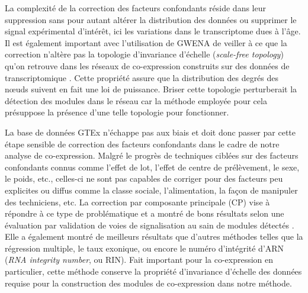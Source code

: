 La complexité de la correction des facteurs confondants réside dans leur suppression sans pour autant altérer la distribution des données ou supprimer le signal expérimental d'intérêt, ici les variations dans le transcriptome dues à l'âge. 
Il est également important avec l'utilisation de GWENA de veiller à ce que la correction n'altère pas la topologie d'invariance d'échelle (\textit{scale-free topology}) qu'on retrouve dans les réseaux de co-expression construits sur des données de transcriptomique . Cette propriété assure que la distribution des degrés des nœuds suivent en fait une loi de puissance. Briser cette topologie perturberait la détection des modules dans le réseau car la méthode employée pour cela présuppose la présence d'une telle topologie pour fonctionner.


La base de données GTEx n'échappe pas aux biais  et doit donc passer par cette étape sensible de correction des facteurs confondants dans le cadre de notre analyse de co-expression.
Malgré le progrès de techniques ciblées sur des facteurs confondants connus comme l'effet de lot, l'effet de centre de prélèvement, le sexe, le poids, etc., celles-ci ne sont pas capables de corriger pour des facteurs peu explicites ou diffus comme la classe sociale, l'alimentation, la façon de manipuler des techniciens, etc. La correction par composante principale (CP) vise à répondre à ce type de problématique et a montré de bons résultats selon une évaluation par validation de voies de signalisation au sain de modules détectés . Elle a également montré de meilleurs résultats que d'autres méthodes telles que la régression multiple, le taux exonique, ou encore le numéro d'intégrité d'ARN (\textit{RNA integrity number}, ou RIN). Fait important pour la co-expression en particulier, cette méthode conserve la propriété d'invariance d'échelle des données requise pour la construction des modules de co-expression dans notre méthode.


